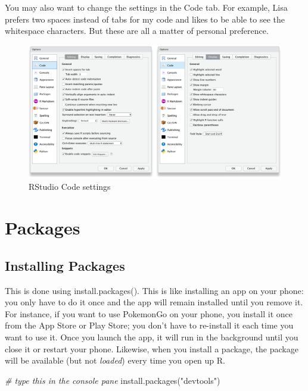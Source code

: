 \documentclass[
  oneside]{book}
\newenvironment{Shaded}{\begin{snugshade}}{\end{snugshade}}
\newcommand{\CommentTok}[1]{\textcolor[rgb]{0.56,0.35,0.01}{\textit{#1}}}
\newcommand{\FunctionTok}[1]{\textcolor[rgb]{0.00,0.00,0.00}{#1}}
\newcommand{\NormalTok}[1]{#1}
\newcommand{\StringTok}[1]{\textcolor[rgb]{0.31,0.60,0.02}{#1}}
\begin{document}
You may also want to change the settings in the Code tab. For example, Lisa prefers two spaces instead of tabs for my code and likes to be able to see the whitespace characters. But these are all a matter of personal preference.

\begin{figure}

{\centering \includegraphics[width=1\linewidth]{images/rstudio_settings_code} 

}

\caption{RStudio Code settings}\label{fig:settings-code}
\end{figure}

\hypertarget{packages}{%
\section{Packages}\label{packages}}

\hypertarget{installing-packages}{%
\subsection{Installing Packages}\label{installing-packages}}

This is done using {install.packages}{(}{)}. This is like installing an app on your phone: you only have to do it once and the app will remain installed until you remove it. For instance, if you want to use PokemonGo on your phone, you install it once from the App Store or Play Store; you don't have to re-install it each time you want to use it. Once you launch the app, it will run in the background until you close it or restart your phone. Likewise, when you install a package, the package will be available (but not \emph{loaded}) every time you open up R.

\begin{Shaded}
\begin{Highlighting}[]
\CommentTok{\# type this in the console pane}
\FunctionTok{install.packages}\NormalTok{(}\StringTok{"devtools"}\NormalTok{)}
\end{Highlighting}
\end{Shaded}
\end{document}

